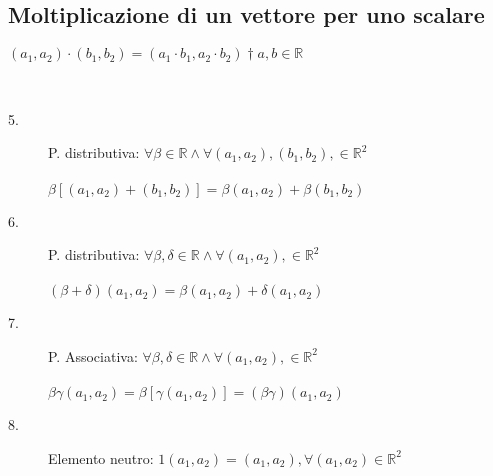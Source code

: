 \subsection{Moltiplicazione di un vettore per uno scalare}

\begin{definizione}
	$(a_{1}, a_{2})\cdot(b_{1},b_{2})=(a_{1}\cdot b_{1}, a_{2}\cdot b_{2})\dagger a,b\in \mathbb{R}$
\end{definizione}
\begin{nota}
	\phantom{}\\
	\begin{description}
		\item[5.] P. distributiva: $\forall \beta\in \mathbb{R} \wedge \forall (a_{1}, a_{2}),(b_{1}, b_{2}), \in \mathbb{R}^{2}$\\\\
		\phantom{texttexttextt}$\beta[(a_{1}, a_{2})+(b_{1}, b_{2})]=\beta(a_{1}, a_{2})+\beta(b_{1}, b_{2})$\\
		\item[6.] P. distributiva: $\forall \beta,\delta\in \mathbb{R} \wedge \forall (a_{1}, a_{2}), \in \mathbb{R}^{2}$\\\\
		\phantom{texttexttextt}$(\beta+\delta)(a_{1}, a_{2})=\beta(a_{1}, a_{2})+\delta(a_{1}, a_{2})$\\
		\item[7.] P. Associativa: $\forall \beta,\delta\in \mathbb{R} \wedge \forall (a_{1}, a_{2}), \in \mathbb{R}^{2}$\\\\
		\phantom{texttexttextt}$\beta\gamma(a_{1}, a_{2})=\beta[\gamma(a_{1}, a_{2})]=(\beta\gamma)(a_{1}, a_{2})$\\
		\item[8.] Elemento neutro: $1(a_{1}, a_{2})=(a_{1}, a_{2}), \forall(a_{1}, a_{2})\in\mathbb{R}^{2}$
	\end{description}
\end{nota}








